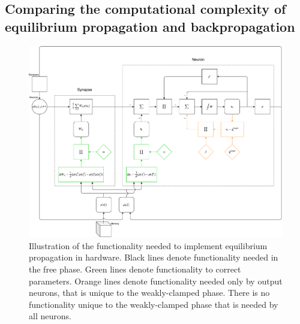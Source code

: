 \documentclass[utf8]{frontiersSCNS}
\begin{document}
\subsection{Comparing the computational complexity of equilibrium propagation and backpropagation}

\begin{figure}
\begin{center}
	\includegraphics[width=\textwidth]{figures/eqp_bd.pdf}
	\caption{Illustration of the functionality needed to implement equilibrium propagation in hardware. Black lines denote functionality needed in the free phase. Green lines denote functionality to correct parameters. Orange lines denote functionality needed only by output neurons, that is unique to the weakly-clamped phase. There is no functionality unique to the weakly-clamped phase that is needed by all neurons.}
	\label{fig:eqp_bd}
\end{center}
\end{figure}
\end{document}
